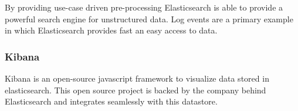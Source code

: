 By providing use-case driven pre-processing Elasticsearch is able to provide a powerful search engine for unstructured data. Log events are a primary example in which
Elasticsearch provides fast an easy access to data.

\subsubsection{Kibana}
Kibana is an open-source javascript framework to visualize data stored in \gls{elasticsearch}. This open source project is backed by the company behind Elasticsearch and integrates
seamlessly with this datastore.